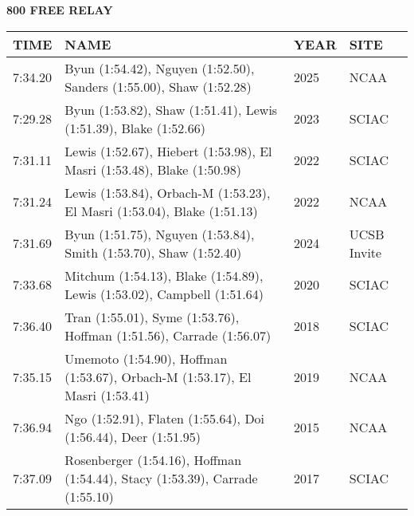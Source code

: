 \begin{table}[H]
\centering
\begin{minipage}[t]{0.6\textwidth}
\centering
\textbf{800 FREE RELAY}\\[0.1cm]
\begin{tabular}{@{}p{1.8cm}p{2.8cm}p{1.2cm}p{1.4cm}@{}}
\hline
    \textbf{TIME} & \textbf{NAME} & \textbf{YEAR} & \textbf{SITE} \\
\hline
    7:34.20 & Byun (1:54.42), Nguyen (1:52.50), Sanders (1:55.00), Shaw (1:52.28) & 2025 & NCAA \\
    7:29.28 & Byun (1:53.82), Shaw (1:51.41), Lewis (1:51.39), Blake (1:52.66) & 2023 & SCIAC \\
    7:31.11 & Lewis (1:52.67), Hiebert (1:53.98), El Masri (1:53.48), Blake (1:50.98) & 2022 & SCIAC \\
    7:31.24 & Lewis (1:53.84), Orbach-M (1:53.23), El Masri (1:53.04), Blake (1:51.13) & 2022 & NCAA \\
    7:31.69 & Byun (1:51.75), Nguyen (1:53.84), Smith (1:53.70), Shaw (1:52.40) & 2024 & UCSB Invite \\
    7:33.68 & Mitchum (1:54.13), Blake (1:54.89), Lewis (1:53.02), Campbell (1:51.64) & 2020 & SCIAC \\
    7:36.40 & Tran (1:55.01), Syme (1:53.76), Hoffman (1:51.56), Carrade (1:56.07) & 2018 & SCIAC \\
    7:35.15 & Umemoto (1:54.90), Hoffman (1:53.67), Orbach-M (1:53.17), El Masri (1:53.41) & 2019 & NCAA \\
    7:36.94 & Ngo (1:52.91), Flaten (1:55.64), Doi (1:56.44), Deer (1:51.95) & 2015 & NCAA \\
    7:37.09 & Rosenberger (1:54.16), Hoffman (1:54.44), Stacy (1:53.39), Carrade (1:55.10) & 2017 & SCIAC \\
\hline
\end{tabular}
\end{minipage}
\end{table}


